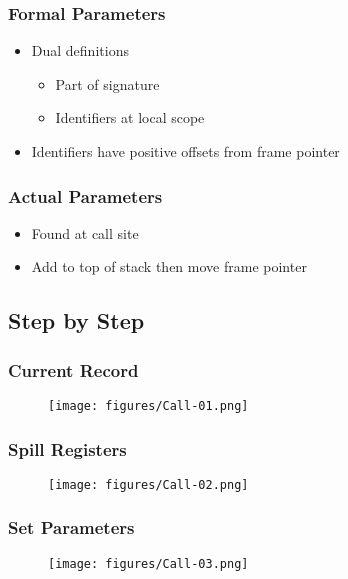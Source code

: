 \documentclass[usepdftitle=false,professionalfonts,compress ]{beamer}
\begin{document}
{
\begin{frame}\frametitle{Formal Parameters}

	\begin{itemize}
	\item Dual definitions

	\begin{itemize}
	\item Part of signature
			\item Identifiers at local scope
				\end{itemize}

			\item Identifiers have positive offsets from frame pointer
				\end{itemize}

\end{frame}}




{
\begin{frame}\frametitle{Actual Parameters}

	\begin{itemize}
	\item Found at call site
			\item Add to top of stack then move frame pointer
				\end{itemize}

\end{frame}}




\subsection{Step by Step}

{
\begin{frame}\frametitle{Current Record}
\begin{figure}
	\texttt{[image: figures/Call-01.png]}\end{figure}
\end{frame}}



{
\begin{frame}\frametitle{Spill Registers}
\begin{figure}
	\texttt{[image: figures/Call-02.png]}\end{figure}
\end{frame}}



{
\begin{frame}\frametitle{Set Parameters}
\begin{figure}
	\texttt{[image: figures/Call-03.png]}\end{figure}
\end{frame}}
\end{document}
